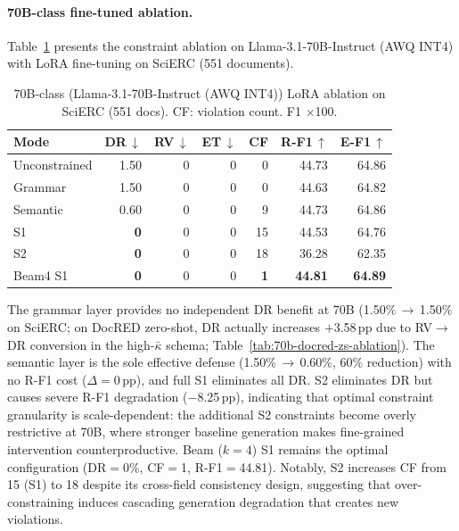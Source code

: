 
\paragraph{70B-class fine-tuned ablation.}
\label{app:70b-ablation}

Table~\ref{tab:70b-ft-ablation} presents the constraint ablation on Llama-3.1-70B-Instruct (AWQ INT4) with LoRA fine-tuning on SciERC (551 documents).

\begin{table}[h]
\centering
\small
\setlength{\tabcolsep}{3.6pt}
\begin{tabular}{@{}l rrrr rr@{}}
\toprule
\textbf{Mode}
  & \textbf{DR\,$\downarrow$} & \textbf{RV\,$\downarrow$} & \textbf{ET\,$\downarrow$} & \textbf{CF}
  & \textbf{R-F1\,$\uparrow$} & \textbf{E-F1\,$\uparrow$} \\
\midrule
Unconstrained & 1.50 & 0 & 0 & 0    & 44.73 & 64.86 \\
Grammar       & 1.50 & 0 & 0 & 0    & 44.63 & 64.82 \\
Semantic      & 0.60 & 0 & 0 & 9    & 44.73 & 64.86 \\
S1            & \textbf{0} & 0 & 0 & 15 & 44.53 & 64.76 \\
S2            & \textbf{0} & 0 & 0 & 18 & 36.28 & 62.35 \\
Beam4 S1      & \textbf{0} & 0 & 0 & \textbf{1} & \textbf{44.81} & \textbf{64.89} \\
\bottomrule
\end{tabular}
\caption{70B-class (Llama-3.1-70B-Instruct (AWQ INT4)) LoRA ablation on SciERC (551 docs).
CF: violation count. F1 $\times$100.}
\label{tab:70b-ft-ablation}
\end{table}

The grammar layer provides no independent DR benefit at 70B (1.50\%\,$\to$\,1.50\% on SciERC; on DocRED zero-shot, DR actually increases $+$3.58\,pp due to RV$\to$DR conversion in the high-$\bar{\kappa}$ schema; Table~\ref{tab:70b-docred-zs-ablation}).
The semantic layer is the sole effective defense (1.50\%\,$\to$\,0.60\%, 60\% reduction) with no R-F1 cost ($\Delta{=}$0\,pp), and full S1 eliminates all DR.
S2 eliminates DR but causes severe R-F1 degradation ($-$8.25\,pp), indicating that optimal constraint granularity is scale-dependent: the additional S2 constraints become overly restrictive at 70B, where stronger baseline generation makes fine-grained intervention counterproductive.
Beam ($k{=}4$) S1 remains the optimal configuration (DR${=}$0\%, CF${=}$1, R-F1${=}$44.81).
Notably, S2 increases CF from 15 (S1) to 18 despite its cross-field consistency design, suggesting that over-constraining induces cascading generation degradation that creates new violations.

